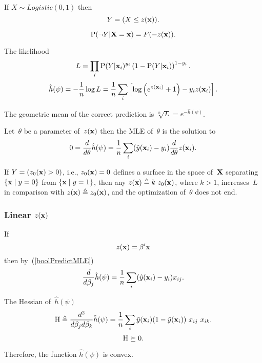\documentclass[10pt,a4paper]{article}
\theoremstyle{plain} \newtheorem{Lem}{Lemma}
\begin{document}
If $X \sim Logistic(0,1)$ then 
$$ Y = (X \le z(\mathbf x)).$$

$$ \mathrm P(\neg Y|\mathbf X = \mathbf x) = F(- z(\mathbf x)). $$

The likelihood
$$ L = \prod_i \mathrm P(Y|\mathbf x_i)^{y_i} \left(1 - \mathrm P(Y|\mathbf x_i) \right)^{1-y_i}. $$
$$ \hat h (\psi) = - \frac 1 n \log L = \frac 1 n \sum_i \left[ \log \left(e^{z(\mathbf x_i)} + 1\right) - y_i z(\mathbf x_i) \right]. $$

The geometric mean of the correct prediction is $\sqrt[n]L = e^{- \hat h(\psi)}$.

Let~$\theta$ be a parameter of~$z(\mathbf x)$ then the MLE of~$\theta$ is the solution to
\begin{equation}\label{boolPredictMLE}
0 = \frac d {d \theta} \hat h (\psi) = \frac 1 n \sum_i (\hat y(\mathbf x_i) - y_i) \frac d {d \theta} z(\mathbf x_i). 
\end{equation}


If $Y = (z_0(\mathbf x) > 0)$, i.e., $z_0(\mathbf x) = 0$ defines a surface in the space of~$\mathbf X$ separating $\{\mathbf x \mid y = 0\}$ from $\{\mathbf x \mid y = 1\}$,
then any $z(\mathbf x) \triangleq k \ z_0(\mathbf x)$, where $k > 1$, increases~$L$ in comparison with $z(\mathbf x) \triangleq z_0(\mathbf x)$,
and the optimization of~$\theta$ does not end.



\subsubsection{Linear $z(\mathbf x)$}

If
\begin{equation}\label{linZ}
z(\mathbf x) = \mathbf \beta' \mathbf x
\end{equation}
then by~(\ref{boolPredictMLE})
$$ \frac d {d \beta_j} \hat h (\psi) = \frac 1 n \sum_i (\hat y(\mathbf x_i) - y_i) x_{ij}. $$

The Hessian of~$\hat h (\psi)$
$$ \mathrm H \triangleq \frac {d^2} {d \beta_j d \beta_k} \hat h (\psi) = \frac 1 n \sum_i \hat y (\mathbf x_i) (1 - \hat y (\mathbf x_i)) \ x_{ij} \ x_{ik}. $$
$$ \mathrm H \succeq 0. $$

Therefore, the function $\hat h (\psi)$ is convex.
\end{document}
